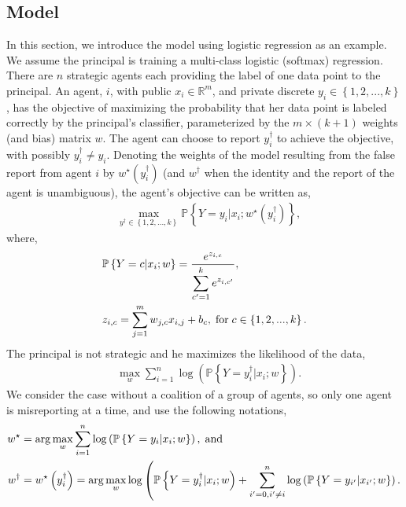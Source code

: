 \documentclass{article}
\begin{document}
\subsection{Model}
In this section, we introduce the model using logistic regression as an example. We assume the principal is training a multi-class logistic (softmax) regression. There are $n $ strategic agents each providing the label of one data point to the principal. An agent, $i $, with public $x_{i} \in \mathbb{R}^{m}$, and private discrete $y_{i} \in \left\{1, 2, ..., k \right\}$, has the objective of maximizing the probability that her data point is labeled correctly by the principal's classifier, parameterized by the $m  \times \left(k  + 1\right)$ weights (and bias) matrix $w $. The agent can choose to report $y^{\dagger}_{i}$ to achieve the objective, with possibly $y^{\dagger}_{i} \neq  y_{i}$. Denoting the weights of the model resulting from the false report from agent $i $ by $w^\star \left(y^{\dagger}_{i}\right)$ (and $w^{\dagger}$ when the identity and the report of the agent is unambiguous), the agent's objective can be written as,
\begin{align*}
&  \displaystyle\max_{y^{\dagger} \in \left\{1, 2, ..., k \right\}} \mathbb{P}\left\{Y = y_{i} | x_{i} ; w^\star \left(y^{\dagger}_{i}\right)\right\},
\end{align*}
where,
\begin{align*}
&  \mathbb{P}\left\{Y = c | x_{i} ; w\right\} = \dfrac{e^{z_{i,c}}}{\displaystyle\sum_{c'=1}^{k} e^{z_{i,c'}}},
\\ &  z_{i,c} = \displaystyle\sum_{j=1}^{m} w_{j,c} x_{i,j} + b_{c} , \text{\;for\;} c \in \left\{1, 2, ..., k\right\}.
\end{align*}
The principal is not strategic and he maximizes the likelihood of the data,
\begin{align*}
&\displaystyle\max_{w} \displaystyle\sum_{i=1}^{n} \log\left(\mathbb{P}\left\{Y = y^{\dagger}_{i} | x_{i} ; w\right\}\right).
\end{align*}
We consider the case without a coalition of a group of agents, so only one agent is misreporting at a time, and use the following notations,
\begin{align*}
w^\star  &= \arg\displaystyle\max_{w} \displaystyle\sum_{i=1}^{n} \log\left(\mathbb{P}\left\{Y = y_{i} | x_{i}; w\right\}\right), \text{\;and\;}
\\ w^{\dagger} &= w^\star \left(y^{\dagger}_{i}\right) = \arg\displaystyle\max_{w} \log\left(\mathbb{P}\left\{Y = y^{\dagger}_{i} | x_{i}; w\right) + \displaystyle\sum_{i' = 0, i' \neq  i}^{n} \log\left(\mathbb{P}\left\{Y = y_{i'} | x_{i'}; w\right\}\right).\right.
\end{align*}
\end{document}
